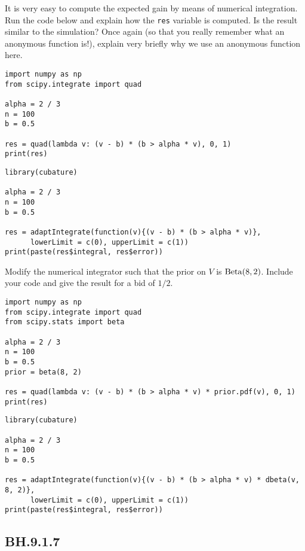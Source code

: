 \begin{exercise}
It is very easy to compute the expected gain by means of numerical integration. Run the code below and explain how the \verb|res| variable is computed.  Is the result similar to the simulation? Once again (so that you really remember what an anonymous function is!), explain very briefly why we use an anonymous function here.
\begin{verbatim}
import numpy as np
from scipy.integrate import quad

alpha = 2 / 3
n = 100
b = 0.5

res = quad(lambda v: (v - b) * (b > alpha * v), 0, 1)
print(res)
\end{verbatim}

\begin{verbatim}
library(cubature)

alpha = 2 / 3
n = 100
b = 0.5

res = adaptIntegrate(function(v){(v - b) * (b > alpha * v)},
      lowerLimit = c(0), upperLimit = c(1))
print(paste(res$integral, res$error))
\end{verbatim}
\end{exercise}

\begin{exercise}
Modify the numerical integrator  such that the prior on $V$ is $\mathrm{Beta}(8, 2)$. Include your code and give the result for a bid of $1/2$.
\begin{solution}
\begin{verbatim}
import numpy as np
from scipy.integrate import quad
from scipy.stats import beta

alpha = 2 / 3
n = 100
b = 0.5
prior = beta(8, 2)

res = quad(lambda v: (v - b) * (b > alpha * v) * prior.pdf(v), 0, 1)
print(res)
\end{verbatim}

\begin{verbatim}
library(cubature)

alpha = 2 / 3
n = 100
b = 0.5

res = adaptIntegrate(function(v){(v - b) * (b > alpha * v) * dbeta(v, 8, 2)},
      lowerLimit = c(0), upperLimit = c(1))
print(paste(res$integral, res$error))

\end{verbatim}
\end{solution}
\end{exercise}

\subsection{BH.9.1.7}

